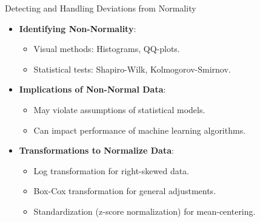 \documentclass[aspectratio=169,xcolor=dvipsnames]{beamer}
\begin{document}
\begin{frame}{Detecting and Handling Deviations from Normality}
\begin{itemize}
    \setlength\itemsep{0.25cm}
    \item \textbf{Identifying Non-Normality}:
    \begin{itemize}
        \item Visual methods: Histograms, QQ-plots.
        \item Statistical tests: Shapiro-Wilk, Kolmogorov-Smirnov.
    \end{itemize}
    \item \textbf{Implications of Non-Normal Data}:
    \begin{itemize}
        \item May violate assumptions of statistical models.
        \item Can impact performance of machine learning algorithms.
    \end{itemize}
    \item \textbf{Transformations to Normalize Data}:
    \begin{itemize}
        \item Log transformation for right-skewed data.
        \item Box-Cox transformation for general adjustments.
        \item Standardization (z-score normalization) for mean-centering.
    \end{itemize}
\end{itemize}
\end{frame}
\end{document}
